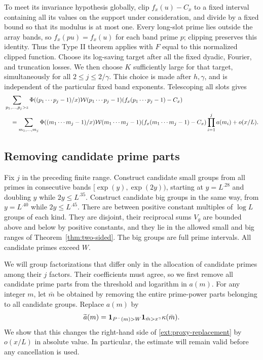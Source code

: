 To meet its invariance hypothesis globally, clip
$f_x(u)-C_x$ to a fixed interval containing all its values on the
support under consideration, and divide by a fixed bound so that
its modulus is at most one.  Every long-slot prime lies outside
the array bands, so $f_x(pu)=f_x(u)$ for each band prime $p$;
clipping preserves this identity.  Thus the Type II theorem
applies with $F$ equal to this normalized clipped function.
Choose its log-saving target after all the fixed dyadic, Fourier,
and truncation losses.  We then choose $K$ sufficiently large
for that target, simultaneously for all $2\leq j\leq2/\gamma$.
This choice is made after $h,\gamma$, and is independent of the
particular fixed band exponents.  Telescoping all slots gives
\begin{align}\label{ext:proxy-replacement}
 &\sum_{p_1,\ldots,p_j>z}
     \Phi((p_1\cdots p_j-1)/x)
     \mathcal W(p_1\cdots p_j-1)
       (f_x(p_1\cdots p_j-1)-C_x)\notag\\
 &\quad=\sum_{m_1,\ldots,m_j}
     \Phi((m_1\cdots m_j-1)/x)
     \mathcal W(m_1\cdots m_j-1)
       (f_x(m_1\cdots m_j-1)-C_x)
                         \prod_{i=1}^ja(m_i)+o(x/L).
\end{align}

\subsection{Removing candidate prime parts}

Fix $j$ in the preceding finite range.  Construct candidate small
groups from all primes in consecutive bands
$[\exp(y),\exp(2y))$, starting at $y=L^{.28}$ and doubling $y$
while $2y\leq L^{.35}$.  Construct candidate big groups in the
same way, from $y=L^{.40}$ while $2y\leq L^{.45}$.
There are between positive constant multiples of $\log L$
groups of each kind.  They are disjoint, their reciprocal sums
$V_g$ are bounded above and below by positive constants, and they
lie in the allowed small and big ranges of
Theorem~\ref{thm:two-sided}.  The big groups are full prime
intervals.  All candidate primes exceed $W$.

We will group factorizations that differ only in the allocation of
candidate primes among their $j$ factors.  Their coefficients must
agree, so we first remove all candidate prime parts from the threshold
and logarithm in $a(m)$.
For any integer $m$, let $\bar m$ be obtained by removing the
entire prime-power parts belonging to all candidate groups.
Replace $a(m)$ by
\begin{equation}\label{ext:stripped-coefficient}
 \widetilde a(m)=\mathbf{1}_{P^-(m)>W}\mathbf{1}_{\bar m>x^\gamma}
                              \kappa(\bar m).
\end{equation}
We show that this changes the right-hand side of
\eqref{ext:proxy-replacement} by $o(x/L)$ in absolute value.
In particular, the estimate will remain valid before any
cancellation is used.

